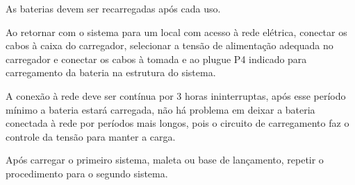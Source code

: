 As baterias devem ser recarregadas após cada uso. 

Ao retornar com o sistema para um local com acesso à rede elétrica, conectar os cabos à caixa do carregador, selecionar a tensão de alimentação adequada no carregador e conectar os cabos à tomada e ao plugue P4 indicado para carregamento da bateria na estrutura do sistema. 

A conexão à rede deve ser contínua por 3 horas ininterruptas, após esse período mínimo a bateria estará carregada, não há problema em deixar a bateria conectada à rede por períodos mais longos, pois o circuito de carregamento faz o controle da tensão para manter a carga. 

Após carregar o primeiro sistema, maleta ou base de lançamento, repetir o procedimento para o segundo sistema.
